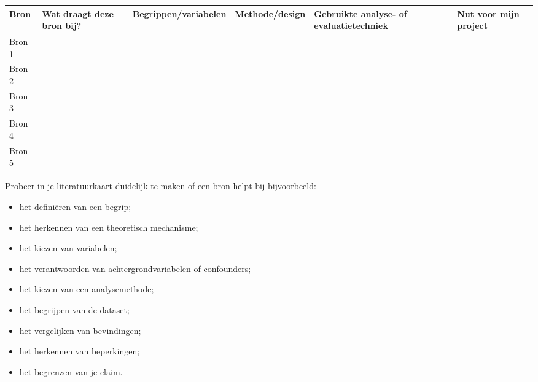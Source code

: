 \documentclass[
  letterpaper,
  DIV=11,
  numbers=noendperiod]{scrreprt}
\newcounter{none} %
\providecommand{\tightlist}{%
  \setlength{\itemsep}{0pt}\setlength{\parskip}{0pt}}
\begin{document}
{\def\LTcaptype{none} %
\begin{longtable}[]{@{}
  >{\raggedright\arraybackslash}p{}
  >{\raggedright\arraybackslash}p{}
  >{\raggedright\arraybackslash}p{}
  >{\raggedright\arraybackslash}p{}
  >{\raggedright\arraybackslash}p{}
  >{\raggedright\arraybackslash}p{}@{}}
\toprule\noalign{}
\begin{minipage}[b]{\linewidth}\raggedright
Bron
\end{minipage} & \begin{minipage}[b]{\linewidth}\raggedright
Wat draagt deze bron bij?
\end{minipage} & \begin{minipage}[b]{\linewidth}\raggedright
Begrippen/variabelen
\end{minipage} & \begin{minipage}[b]{\linewidth}\raggedright
Methode/design
\end{minipage} & \begin{minipage}[b]{\linewidth}\raggedright
Gebruikte analyse- of evaluatietechniek
\end{minipage} & \begin{minipage}[b]{\linewidth}\raggedright
Nut voor mijn project
\end{minipage} \\
\midrule\noalign{}
\endhead
\bottomrule\noalign{}
\endlastfoot
Bron 1 & & & & & \\
Bron 2 & & & & & \\
Bron 3 & & & & & \\
Bron 4 & & & & & \\
Bron 5 & & & & & \\
\end{longtable}
}

Probeer in je literatuurkaart duidelijk te maken of een bron helpt bij
bijvoorbeeld:

\begin{itemize}
\tightlist
\item
  het definiëren van een begrip;
\item
  het herkennen van een theoretisch mechanisme;
\item
  het kiezen van variabelen;
\item
  het verantwoorden van achtergrondvariabelen of confounders;
\item
  het kiezen van een analysemethode;
\item
  het begrijpen van de dataset;
\item
  het vergelijken van bevindingen;
\item
  het herkennen van beperkingen;
\item
  het begrenzen van je claim.
\end{itemize}
\end{document}
